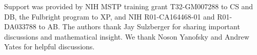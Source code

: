 Support was provided by NIH MSTP training grant T32-GM007288 to CS and DB, the Fulbright program to XP, and NIH R01-CA164468-01 and R01-DA033788 to AB. The authors thank Jay Sulzberger for sharing important discussions and mathematical insight. We thank Noson Yanofsky and Andrew Yates for helpful discussions.
